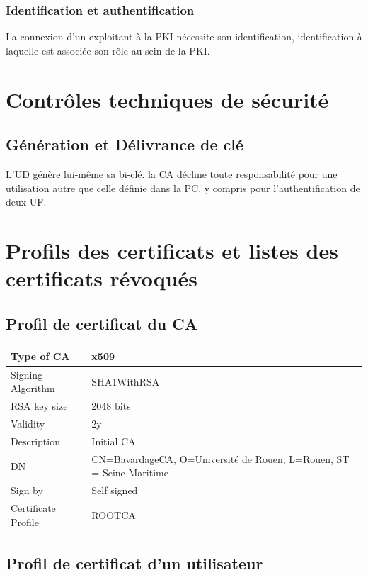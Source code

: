 \documentclass[a4paper,11pt,french]{book}
\begin{document}
\subsubsection{Identification et authentification}
La connexion d'un exploitant à la PKI nécessite son identification, identification à laquelle est associée son rôle au sein de la PKI.

\section{Contrôles techniques de sécurité}

\subsection{Génération et Délivrance de clé}

L'UD génère lui-même sa bi-clé. la CA décline toute responsabilité pour une utilisation autre que celle définie dans la PC, y
compris pour l'authentification de deux UF. 


\section{Profils des certificats et listes des certificats révoqués}
\subsection{Profil de certificat du CA}

\begin{tabular}{|l|p{10cm}|}
\hline
Type of CA  & x509
\\
\hline
Signing Algorithm  &  SHA1WithRSA
\\
\hline
RSA key size  & 2048 bits
\\
\hline
Validity & 2y
\\
\hline
Description  & Initial CA
\\
\hline
DN &  CN=BavardageCA, O=Université de Rouen, L=Rouen, ST = Seine-Maritime
\\
\hline
 Sign by  & Self signed
\\
\hline
Certificate Profile  & ROOTCA
\\
\hline
\end{tabular}



\subsection{Profil de certificat d'un utilisateur}
\end{document}
